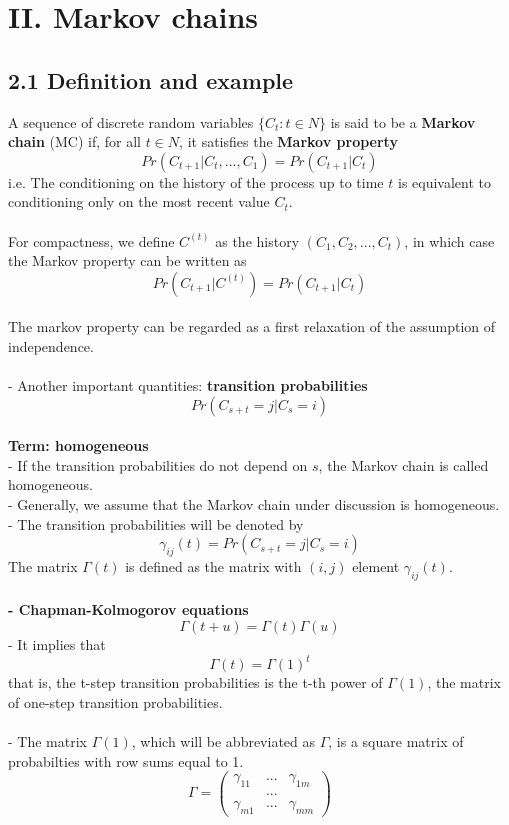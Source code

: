 \documentclass{article}
\begin{document}
\section*{II. Markov chains}
\subsection*{2.1 Definition and example}
A sequence of discrete random variables $\{C_t: t \in N\}$ is said to be a \textbf{Markov chain} (MC) if, for all $t \in N$, it satisfies the \textbf{Markov property}
$$Pr(C_{t+1} | C_t, ..., C_1) = Pr(C_{t+1} | C_t)$$
i.e. The conditioning on the history of the process up to time $t$ is equivalent to conditioning only on the most recent value $C_t$. \\
\\
For compactness, we define $C^{(t)}$ as the history $(C_1, C_2, ..., C_t)$, in which case the Markov property can be written as 
$$Pr(C_{t+1} | C^{(t)}) = Pr(C_{t+1}|C_t)$$
\\
The markov property can be regarded as a first relaxation of the assumption of independence. \\
\\
- Another important quantities: \textbf{transition probabilities} 
$$Pr(C_{s+t} = j | C_s = i)$$
\\
\textbf{Term: homogeneous} \\
- If the transition probabilities do not depend on $s$, the Markov chain is called homogeneous. \\
- Generally, we assume that the Markov chain under discussion is homogeneous. \\
- The transition probabilities will be denoted by 
$$\gamma_{ij}(t) = Pr(C_{s+t} = j | C_s = i)$$
The matrix $\Gamma(t)$ is defined as the matrix with $(i, j)$ element $\gamma_{ij}(t)$. \\
\\
\textbf{- Chapman-Kolmogorov equations}
$$\Gamma(t+u) = \Gamma(t) \Gamma(u)$$
- It implies that 
$$\Gamma(t) = \Gamma(1)^t$$
that is, the t-step transition probabilities is the t-th power of $\Gamma(1)$, the matrix of one-step transition probabilities.  \\
\\
- The matrix \textbf{$\Gamma(1)$}, which will be abbreviated as $\Gamma$, is a square matrix of probabilties with row sums equal to 1. \\
$$\Gamma = \begin{pmatrix} \gamma_{11} & ... & \gamma_{1m} \\ & ... & \\ \gamma_{m1} & ... & \gamma_{mm} \end{pmatrix}$$
\end{document}
